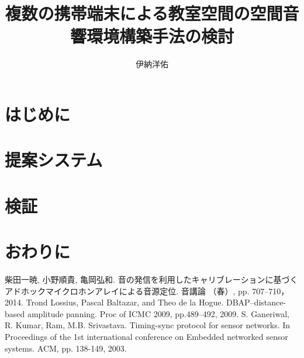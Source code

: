 \documentclass[11pt]{jarticle}
\title{複数の携帯端末による教室空間の空間音響環境構築手法の検討}
\author{伊納洋佑}
\begin{document}
\maketitle

\section{はじめに}


\section{提案システム}


\section{検証}


\section{おわりに}



\begin{thebibliography}{10}

 柴田一暁, 小野順貴, 亀岡弘和. 音の発信を利用したキャリブレーションに基づくアドホックマイクロホンアレイによる音源定位. 音講論 （春）, pp. 707--710，2014.
      Trond Lossius, Pascal Baltazar, and Theo de la Hogue. DBAP–distance-based amplitude panning. Proc of ICMC 2009, pp.489--492, 2009.
      S. Ganeriwal, R. Kumar, Ram, M.B. Srivastava. Timing-sync protocol for sensor networks. In Proceedings of the 1st international conference on Embedded networked sensor systems. ACM,  pp. 138-149, 2003.

\end{thebibliography}
\end{document}
